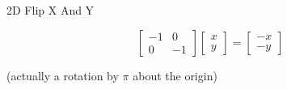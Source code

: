 \documentclass{beamer}
\begin{document}
\begin{frame}{2D Flip X And Y}

\[ \left[ \begin{array}{cc} -1 & 0 \\ 0 & -1 \end{array} \right] \left[ \begin{array}{c} x \\ y \end{array} \right] =  \left[ \begin{array}{c} -x \\ -y \end{array} \right] \]

(actually a rotation by $\pi$ about the origin)

\begin{figure}[t]
    \captionsetup[subfloat]{labelformat=empty}
	\centering
\end{figure}

\end{frame}
\end{document}
